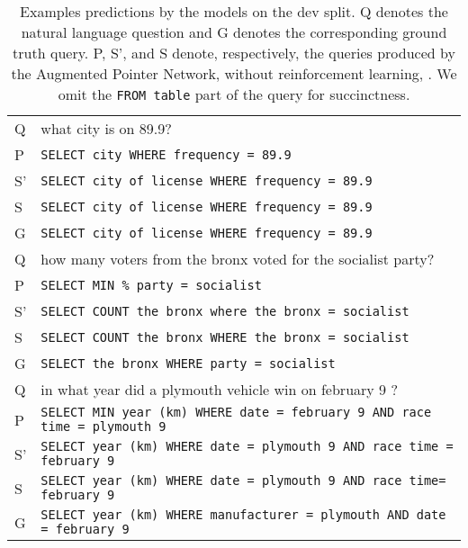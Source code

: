 \begin{table}[ht]
\begin{tabular}{ll}
\midrule
Q       & what city is on 89.9?                                                                                          \\
P   & \texttt{SELECT city WHERE frequency = 89.9}                                                                  \\
S' & \texttt{SELECT city of license WHERE frequency = 89.9}                                                       \\
S         & \texttt{SELECT city of license WHERE frequency = 89.9}                                                       \\
G   & \texttt{SELECT city of license WHERE frequency = 89.9}                                                       \\
\midrule
Q       & how many voters from the bronx voted for the socialist party?                                                  \\
P   & \texttt{SELECT MIN \% party = socialist}                                                                     \\
S' & \texttt{SELECT COUNT the bronx where the bronx = socialist}                                                  \\
S         & \texttt{SELECT COUNT the bronx WHERE the bronx = socialist}                                                  \\
G   & \texttt{SELECT the bronx WHERE party = socialist}                                                            \\
\midrule
Q          & in what year did a plymouth vehicle win on february 9 ?                                                        \\
P   & \texttt{SELECT MIN year (km) WHERE date = february 9 AND race time = plymouth 9}                              \\
S' & \texttt{SELECT year (km) WHERE date = plymouth 9 AND race time = february 9}                                      \\
S         & \texttt{SELECT year (km) WHERE date = plymouth 9 AND race time= february 9}                                      \\
G   & \texttt{SELECT year (km) WHERE manufacturer = plymouth AND date = february 9}                                     \\
\bottomrule
\end{tabular}
\caption{
Examples predictions by the models on the dev split.
Q denotes the natural language question and G denotes the corresponding ground truth query.
P, S', and S denote, respectively, the queries produced by the Augmented Pointer Network, \model without reinforcement learning, \model.
We omit the \texttt{FROM table} part of the query for succinctness.
}
\label{table:qualitative}
\end{table}